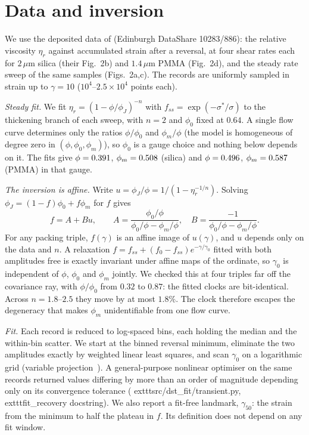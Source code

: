 \documentclass[aps,pre,reprint,superscriptaddress,nofootinbib]{revtex4-2}
\begin{document}
\section{Data and inversion}

We use the deposited data of \citet{Lin2015} (Edinburgh DataShare 10283/886): the relative
viscosity $\eta_r$ against accumulated strain after a reversal, at four shear rates each
for $2\,\mu$m silica (their Fig.~2b) and $1.4\,\mu$m PMMA (Fig.~2d), and the steady rate
sweep of the same samples (Figs.~2a,c). The records are uniformly sampled in strain up
to $\gamma=10$ ($10^4$--$2.5\times10^4$ points each).

\emph{Steady fit.} We fit $\eta_r=(1-\phi/\phi_J)^{-n}$ with
$f_{ss}=\exp(-\sigma^*/\sigma)$ to the thickening branch of each sweep, with $n=2$ and
$\phi_0$ fixed at $0.64$. A single flow curve determines only the ratios
$\phi/\phi_0$ and $\phi_m/\phi$ (the model is homogeneous of degree zero in
$(\phi,\phi_0,\phi_m)$), so $\phi_0$ is a gauge choice and nothing below depends on it.
The fits give $\phi=0.391$, $\phi_m=0.508$ (silica) and $\phi=0.496$, $\phi_m=0.587$
(PMMA) in that gauge.

\emph{The inversion is affine.} Write $u=\phi_J/\phi=1/(1-\eta_r^{-1/n})$. Solving
$\phi_J=(1-f)\phi_0+f\phi_m$ for $f$ gives
\begin{equation}
f=A+Bu,\qquad A=\frac{\phi_0/\phi}{\phi_0/\phi-\phi_m/\phi},\quad
B=\frac{-1}{\phi_0/\phi-\phi_m/\phi}.
\end{equation}
For any packing triple, $f(\gamma)$ is an affine image of $u(\gamma)$, and $u$ depends only on
the data and $n$. A relaxation $f=f_{ss}+(f_0-f_{ss})e^{-\gamma/\gamma_0}$ fitted with both
amplitudes free is exactly invariant under affine maps of the ordinate, so $\gamma_0$ is
independent of $\phi$, $\phi_0$ and $\phi_m$ jointly. We checked this at four triples far
off the covariance ray, with $\phi/\phi_0$ from $0.32$ to $0.87$: the fitted clocks are
bit-identical. Across $n=1.8$--$2.5$ they move by at most $1.8\%$. The clock therefore  %
escapes the degeneracy that makes $\phi_m$ unidentifiable from one flow curve.

\emph{Fit.} Each record is reduced to log-spaced bins, each holding the median and the
within-bin scatter. We start at the binned reversal minimum, eliminate the two amplitudes
exactly by weighted linear least squares, and scan $\gamma_0$ on a logarithmic grid
(variable projection~\cite{GolubPereyra1973}). A general-purpose nonlinear optimiser on the same records returned values differing by
more than an order of magnitude depending only on its convergence tolerance
(	exttt{src/dst\_fit/transient.py}, 	exttt{fit\_recovery} docstring). We also report a
fit-free landmark, $\gamma_{50}$: the strain from the minimum to half the plateau in $f$.
Its definition does not depend on any fit window.
\end{document}
